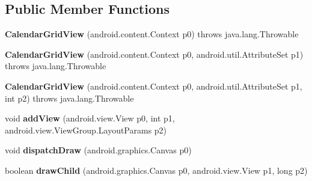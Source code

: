 \subsection*{Public Member Functions}
\begin{DoxyCompactItemize}
\item 
\hypertarget{classmd5afd6673e0ee9440e9d745cae3b1062af_1_1CalendarGridView_a1786b487e618bc95d28dc6c122005427}{}{\bfseries Calendar\+Grid\+View} (android.\+content.\+Context p0)  throws java.\+lang.\+Throwable 	\label{classmd5afd6673e0ee9440e9d745cae3b1062af_1_1CalendarGridView_a1786b487e618bc95d28dc6c122005427}

\item 
\hypertarget{classmd5afd6673e0ee9440e9d745cae3b1062af_1_1CalendarGridView_a6dfe321b893feade50f4c4e1df6e3fde}{}{\bfseries Calendar\+Grid\+View} (android.\+content.\+Context p0, android.\+util.\+Attribute\+Set p1)  throws java.\+lang.\+Throwable 	\label{classmd5afd6673e0ee9440e9d745cae3b1062af_1_1CalendarGridView_a6dfe321b893feade50f4c4e1df6e3fde}

\item 
\hypertarget{classmd5afd6673e0ee9440e9d745cae3b1062af_1_1CalendarGridView_a8f8889880f99e1fc7c7e6e3cc50743db}{}{\bfseries Calendar\+Grid\+View} (android.\+content.\+Context p0, android.\+util.\+Attribute\+Set p1, int p2)  throws java.\+lang.\+Throwable 	\label{classmd5afd6673e0ee9440e9d745cae3b1062af_1_1CalendarGridView_a8f8889880f99e1fc7c7e6e3cc50743db}

\item 
\hypertarget{classmd5afd6673e0ee9440e9d745cae3b1062af_1_1CalendarGridView_aeae8f9835ad915dc38c6c1a9682e71f8}{}void {\bfseries add\+View} (android.\+view.\+View p0, int p1, android.\+view.\+View\+Group.\+Layout\+Params p2)\label{classmd5afd6673e0ee9440e9d745cae3b1062af_1_1CalendarGridView_aeae8f9835ad915dc38c6c1a9682e71f8}

\item 
\hypertarget{classmd5afd6673e0ee9440e9d745cae3b1062af_1_1CalendarGridView_a64339a27cf402e6d6261ebeb4e77cebc}{}void {\bfseries dispatch\+Draw} (android.\+graphics.\+Canvas p0)\label{classmd5afd6673e0ee9440e9d745cae3b1062af_1_1CalendarGridView_a64339a27cf402e6d6261ebeb4e77cebc}

\item 
\hypertarget{classmd5afd6673e0ee9440e9d745cae3b1062af_1_1CalendarGridView_a32507757aa7ab53591443684a718908a}{}boolean {\bfseries draw\+Child} (android.\+graphics.\+Canvas p0, android.\+view.\+View p1, long p2)\label{classmd5afd6673e0ee9440e9d745cae3b1062af_1_1CalendarGridView_a32507757aa7ab53591443684a718908a}


\end{DoxyCompactItemize}
